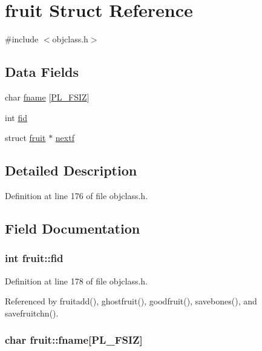 \hypertarget{structfruit}{\section{fruit Struct Reference}
\label{structfruit}
}


{\ttfamily \#include $<$objclass.\+h$>$}

\subsection*{Data Fields}
\begin{DoxyCompactItemize}
\item 
char \hyperlink{structfruit_aaf40871bc1836c7997ea051693cbd758}{fname} \mbox{[}\hyperlink{global_8h_a940b91d481e2c384555740a0135fb38d}{P\+L\+\_\+\+F\+S\+I\+Z}\mbox{]}
\item 
int \hyperlink{structfruit_ad6877c834bde1a6c94370dab88feb2f1}{fid}
\item 
struct \hyperlink{structfruit}{fruit} $\ast$ \hyperlink{structfruit_abdefc7da964abc0fe643d941b7ab3057}{nextf}
\end{DoxyCompactItemize}


\subsection{Detailed Description}


Definition at line 176 of file objclass.\+h.



\subsection{Field Documentation}
\hypertarget{structfruit_ad6877c834bde1a6c94370dab88feb2f1}{
\subsubsection[{fid}]{\setlength{\rightskip}{0pt plus 5cm}int fruit\+::fid}}\label{structfruit_ad6877c834bde1a6c94370dab88feb2f1}


Definition at line 178 of file objclass.\+h.



Referenced by fruitadd(), ghostfruit(), goodfruit(), savebones(), and savefruitchn().

\hypertarget{structfruit_aaf40871bc1836c7997ea051693cbd758}{
\subsubsection[{fname}]{\setlength{\rightskip}{0pt plus 5cm}char fruit\+::fname\mbox{[}{\bf P\+L\+\_\+\+F\+S\+I\+Z}\mbox{]}}}\label{structfruit_aaf40871bc1836c7997ea051693cbd758}


